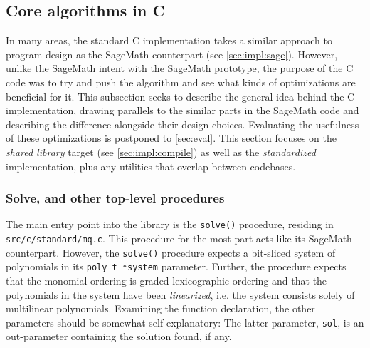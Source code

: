 \subsection{Core algorithms in C} \label{sec:impl:c}

In many areas, the standard C implementation takes a similar approach to program design as the SageMath counterpart (see \cref{sec:impl:sage}). However, unlike the SageMath intent with the SageMath prototype, the purpose of the C code was to try and push the algorithm and see what kinds of optimizations are beneficial for it. This subsection seeks to describe the general idea behind the C implementation, drawing parallels to the similar parts in the SageMath code and describing the difference alongside their design choices. Evaluating the usefulness of these optimizations is postponed to \cref{sec:eval}. This section focuses on the \textit{shared library} target (see \cref{sec:impl:compile}) as well as the \textit{standardized} implementation, plus any utilities that overlap between codebases.

\subsubsection{Solve, and other top-level procedures} \label{sec:impl:c:solve}

The main entry point into the library is the \texttt{solve()} procedure, residing in \texttt{src/c/standard/mq.c}. This procedure for the most part acts like its SageMath counterpart. However, the \texttt{solve()} procedure expects a bit-sliced system of polynomials in its \texttt{poly\_t *system} parameter. Further, the procedure expects that the monomial ordering is graded lexicographic ordering and that the polynomials in the system have been \textit{linearized}, i.e. the system consists solely of multilinear polynomials. Examining the function declaration, the other parameters should be somewhat self-explanatory:
The latter parameter, \texttt{sol}, is an out-parameter containing the solution found, if any.

